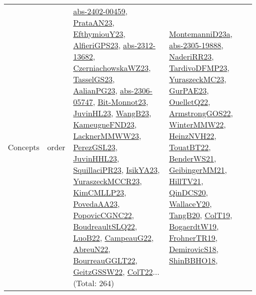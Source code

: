 {\begin{longtable}{lp{3cm}>{\raggedright}p{6cm}>{\raggedright}p{6cm}p{8cm}}
Concepts & order & \href{articles/abs-2402-00459.pdf}{abs-2402-00459}\cite{abs-2402-00459}, \href{articles/PrataAN23.pdf}{PrataAN23}\cite{PrataAN23}, \href{papers/EfthymiouY23.pdf}{EfthymiouY23}\cite{EfthymiouY23}, \href{articles/AlfieriGPS23.pdf}{AlfieriGPS23}\cite{AlfieriGPS23}, \href{articles/abs-2312-13682.pdf}{abs-2312-13682}\cite{abs-2312-13682}, \href{articles/CzerniachowskaWZ23.pdf}{CzerniachowskaWZ23}\cite{CzerniachowskaWZ23}, \href{papers/TasselGS23.pdf}{TasselGS23}\cite{TasselGS23}, \href{papers/AalianPG23.pdf}{AalianPG23}\cite{AalianPG23}, \href{articles/abs-2306-05747.pdf}{abs-2306-05747}\cite{abs-2306-05747}, \href{papers/Bit-Monnot23.pdf}{Bit-Monnot23}\cite{Bit-Monnot23}, \href{papers/JuvinHL23.pdf}{JuvinHL23}\cite{JuvinHL23}, \href{papers/WangB23.pdf}{WangB23}\cite{WangB23}, \href{papers/KameugneFND23.pdf}{KameugneFND23}\cite{KameugneFND23}, \href{articles/LacknerMMWW23.pdf}{LacknerMMWW23}\cite{LacknerMMWW23}, \href{papers/PerezGSL23.pdf}{PerezGSL23}\cite{PerezGSL23}, \href{papers/JuvinHHL23.pdf}{JuvinHHL23}\cite{JuvinHHL23}, \href{papers/SquillaciPR23.pdf}{SquillaciPR23}\cite{SquillaciPR23}, \href{articles/IsikYA23.pdf}{IsikYA23}\cite{IsikYA23}, \href{articles/YuraszeckMCCR23.pdf}{YuraszeckMCCR23}\cite{YuraszeckMCCR23}, \href{papers/KimCMLLP23.pdf}{KimCMLLP23}\cite{KimCMLLP23}, \href{papers/PovedaAA23.pdf}{PovedaAA23}\cite{PovedaAA23}, \href{papers/PopovicCGNC22.pdf}{PopovicCGNC22}\cite{PopovicCGNC22}, \href{papers/BoudreaultSLQ22.pdf}{BoudreaultSLQ22}\cite{BoudreaultSLQ22}, \href{papers/LuoB22.pdf}{LuoB22}\cite{LuoB22}, \href{articles/CampeauG22.pdf}{CampeauG22}\cite{CampeauG22}, \href{articles/AbreuN22.pdf}{AbreuN22}\cite{AbreuN22}, \href{articles/BourreauGGLT22.pdf}{BourreauGGLT22}\cite{BourreauGGLT22}, \href{papers/GeitzGSSW22.pdf}{GeitzGSSW22}\cite{GeitzGSSW22}, \href{articles/ColT22.pdf}{ColT22}\cite{ColT22}... (Total: 264) & \href{articles/MontemanniD23a.pdf}{MontemanniD23a}\cite{MontemanniD23a}, \href{articles/abs-2305-19888.pdf}{abs-2305-19888}\cite{abs-2305-19888}, \href{articles/NaderiRR23.pdf}{NaderiRR23}\cite{NaderiRR23}, \href{papers/TardivoDFMP23.pdf}{TardivoDFMP23}\cite{TardivoDFMP23}, \href{papers/YuraszeckMC23.pdf}{YuraszeckMC23}\cite{YuraszeckMC23}, \href{articles/GurPAE23.pdf}{GurPAE23}\cite{GurPAE23}, \href{papers/OuelletQ22.pdf}{OuelletQ22}\cite{OuelletQ22}, \href{papers/ArmstrongGOS22.pdf}{ArmstrongGOS22}\cite{ArmstrongGOS22}, \href{papers/WinterMMW22.pdf}{WinterMMW22}\cite{WinterMMW22}, \href{articles/HeinzNVH22.pdf}{HeinzNVH22}\cite{HeinzNVH22}, \href{papers/TouatBT22.pdf}{TouatBT22}\cite{TouatBT22}, \href{papers/BenderWS21.pdf}{BenderWS21}\cite{BenderWS21}, \href{papers/GeibingerMM21.pdf}{GeibingerMM21}\cite{GeibingerMM21}, \href{papers/HillTV21.pdf}{HillTV21}\cite{HillTV21}, \href{articles/QinDCS20.pdf}{QinDCS20}\cite{QinDCS20}, \href{articles/WallaceY20.pdf}{WallaceY20}\cite{WallaceY20}, \href{papers/TangB20.pdf}{TangB20}\cite{TangB20}, \href{papers/ColT19.pdf}{ColT19}\cite{ColT19}, \href{papers/BogaerdtW19.pdf}{BogaerdtW19}\cite{BogaerdtW19}, \href{papers/FrohnerTR19.pdf}{FrohnerTR19}\cite{FrohnerTR19}, \href{papers/DemirovicS18.pdf}{DemirovicS18}\cite{DemirovicS18}, \href{articles/ShinBBHO18.pdf}{ShinBBHO18}\cite{ShinBBHO18}, 
\end{longtable}}
